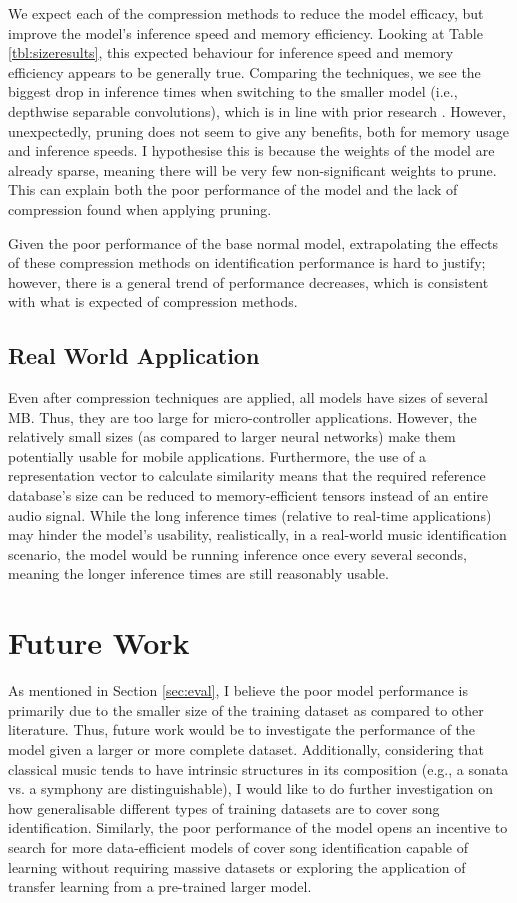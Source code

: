 \documentclass{article}
\begin{document}
{We expect each of the compression methods to reduce the model efficacy, but improve the model's inference speed and memory efficiency. Looking at Table \ref{tbl:sizeresults}, this expected behaviour for inference speed and memory efficiency appears to be generally true. Comparing the techniques, we see the biggest drop in inference times when switching to the smaller model (i.e., depthwise separable convolutions), which is in line with prior research \cite{Chollet2017}. However, unexpectedly, pruning does not seem to give any benefits, both for memory usage and inference speeds. I hypothesise this is because the weights of the model are already sparse, meaning there will be very few non-significant weights to prune. This can explain both the poor performance of the model and the lack of compression found when applying pruning.

Given the poor performance of the base normal model, extrapolating the effects of these compression methods on identification performance is hard to justify; however, there is a general trend of performance decreases, which is consistent with what is expected of compression methods.

\subsection{Real World Application}
Even after compression techniques are applied, all models have sizes of several MB. Thus, they are too large for micro-controller applications. However, the relatively small sizes (as compared to larger neural networks) make them potentially usable for mobile applications. Furthermore, the use of a representation vector to calculate similarity means that the required reference database's size can be reduced to memory-efficient tensors instead of an entire audio signal. While the long inference times (relative to real-time applications) may hinder the model's usability, realistically, in a real-world music identification scenario, the model would be running inference once every several seconds, meaning the longer inference times are still reasonably usable.

\section{Future Work}\label{sec:future}
As mentioned in Section \ref{sec:eval}, I believe the poor model performance is primarily due to the smaller size of the training dataset as compared to other literature. Thus, future work would be to investigate the performance of the model given a larger or more complete dataset. Additionally, considering that classical music tends to have intrinsic structures in its composition (e.g., a sonata vs. a symphony are distinguishable), I would like to do further investigation on how generalisable different types of training datasets are to cover song identification. Similarly, the poor performance of the model opens an incentive to search for more data-efficient models of cover song identification capable of learning without requiring massive datasets or exploring the application of transfer learning from a pre-trained larger model.

}
\end{document}
